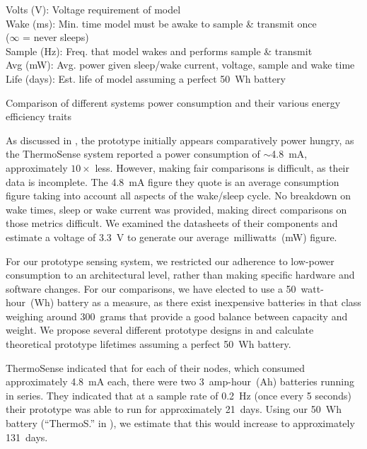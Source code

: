 \documentclass[../thesis/thesis.tex]{subfiles}
\begin{document}
\begin{table}
{{\begin{tabbing}
Volts (V): \> Voltage requirement of model\\
Wake (ms): \> Min. time model must be awake to sample \& transmit once\\
           \> ($\infty$ = never sleeps)\\
Sample (Hz): \> Freq. that model wakes and performs sample \& transmit\\
Avg (mW): \> Avg. power given sleep/wake current, voltage, sample and wake time\\
Life (days): \> Est. life of model assuming a perfect 50~Wh battery
\end{tabbing}}}
\vspace*{-20px}
\caption{Comparison of different systems power consumption and their various energy efficiency traits}
\label{tab:lives}
\end{table}

As discussed in , the prototype initially appears comparatively power hungry, as the ThermoSense system reported a power consumption of $\sim$4.8~mA, approximately $10\times$ less. However, making fair comparisons is difficult, as their data is incomplete. The 4.8~mA figure they quote is an average consumption figure taking into account all aspects of the wake/sleep cycle. No breakdown on wake times, sleep or wake current was provided, making direct comparisons on those metrics difficult. We examined the datasheets of their components and estimate a voltage of 3.3~V to generate our average~milliwatts~(mW) figure.

For our prototype sensing system, we restricted our adherence to low-power consumption to an architectural level, rather than making specific hardware and software changes. For our comparisons, we have elected to use a 50~watt-hour~(Wh) battery as a measure, as there exist inexpensive batteries in that class weighing around 300~grams \cite{AdafruitBattery} that provide a good balance between capacity and weight. We propose several different prototype designs in  and calculate theoretical prototype lifetimes assuming a perfect 50~Wh battery.

ThermoSense indicated that for each of their nodes, which consumed approximately 4.8~mA each, there were two 3~amp-hour~(Ah) batteries running in series. They indicated that at a sample rate of 0.2~Hz (once every 5 seconds) their prototype was able to run for approximately 21~days. Using our 50~Wh battery (``ThermoS.'' in ), we estimate that this would increase to approximately 131~days.
\end{document}
